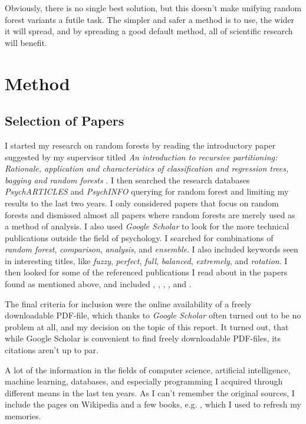 \documentclass[a4paper,man,12pt,apacite,floatsintext,draftfirst]{apa6} %
\begin{document}
Obviously, there is no single best solution, but this doesn't make unifying
random forest variants a futile task.
The simpler and safer a method is to use, the wider it will spread, and by
spreading a good default method, all of scientific research will benefit.

\newpage
\section{Method}
\subsection{Selection of Papers}
I started my research on random forests by reading the
introductory paper suggested by my supervisor titled
\emph{An introduction to recursive partitioning: Rationale, application
and characteristics of classification and regression trees, bagging and
random forests} \cite{strobl2009introduction}.
I then searched the research databases \emph{PsychARTICLES} and
\emph{PsychINFO} querying for random forest and limiting my results
to the last two years.
I only considered papers that focus on random forests and
dismissed almost all papers where random forests are merely used as a
method of analysis.
I also used \emph{Google Scholar} to look for the more technical
publications outside the field of psychology.
I searched for combinations of \emph{random forest}, \emph{comparison},
\emph{analysis}, and \emph{ensemble}.
I also included keywords seen in interesting titles, like \emph{fuzzy},
\emph{perfect}, \emph{full}, \emph{balanced}, \emph{extremely}, and
\emph{rotation}.
I then looked for some of the referenced publications I read about in the
papers found as mentioned above, and included ,
, , ,
and .

The final criteria for inclusion were the online availability of a freely
downloadable PDF-file, which thanks to \emph{Google Scholar} often turned
out to be no problem at all, and my decision on the topic of
this report.
It turned out, that while Google Scholar is convenient to find freely
downloadable PDF-files, its citations aren't up to par.

A lot of the information in the fields of computer science, artificial
intelligence, machine learning, databases, and especially programming
I acquired through different means in the last ten years.
As I can't remember the original sources, I include the pages
on Wikipedia and a few books, e.g. ,
which I used to refresh my memories.
\end{document}
